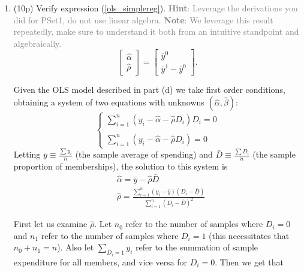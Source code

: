 \documentclass{article}
\begin{document}
\begin{enumerate}[label=\textbf{Q\arabic{enumi}}.,ref=Q\arabic{enumi}, wide=0pt, itemsep=1em, topsep=5pt]
\begin{enumerate}
        \newpage
        \item (10p) Verify expression (\ref{ols_simplereg}). \textcolor{gray}{\textbf{Hint}: Leverage the derivations you did for PSet1, do not use linear algebra. \textbf{Note}: We leverage this result repeatedly, make sure to understand it both from an intuitive standpoint and algebraically.}
        \begin{equation} \label{ols_simplereg}
            \left[
            \begin{array}{c}
            \widehat{\alpha } \\
            \widehat{\rho }
            \end{array}
            \right] =\left[
            \begin{array}{c}
            \overline{y}^{0} \\
            \overline{y}^{1}-\overline{y}^{0}
            \end{array}
            \right] \text{.}
        \end{equation}
        \begin{solution}
            {
                Given the OLS model described in part (d) we take first order conditions, obtaining a system of two equations with unknowns $(\hat{\alpha}, \hat{\beta})$:
                \[ \begin{cases}
                    \sum_{i=1}^n (y_i - \hat{\alpha} - \hat{\rho}D_i)D_i = 0\\
                    \\
                    \sum_{i=1}^n (y_i - \hat{\alpha} - \hat{\rho}D_i) = 0
                    \end{cases}
                \]
                Letting $\bar{y} \equiv \frac{\sum y_i}{n}$ (the sample average of spending)  and $\bar{D} \equiv \frac{\sum D_i}{n}$ (the sample proportion of memberships), the solution to this system is 
                \begin{align*}
                    &\hat{\alpha} = \bar{y} - \hat{\rho}\bar{D} \\
                    &\hat{\rho} = \frac{\sum_{i=1}^n (y_i - \bar{y})(D_i - \bar{D})}{\sum_{i = 1}^n (D_i - \bar{D})^2}
                \end{align*}
                
                First let us examine $\hat{\rho}$. Let $n_0$ refer to the number of samples where $D_i = 0$ and $n_1$ refer to the number of samples where $D_i = 1$ (this necessitates that $n_0 + n_1 = n$). Also let $\sum_{D_i = 1} y_i$ refer to the summation of sample expenditure for all members, and vice versa for $D_i = 0$. Then we get that

}
\end{solution}
\end{enumerate}
\end{enumerate}
\end{document}
